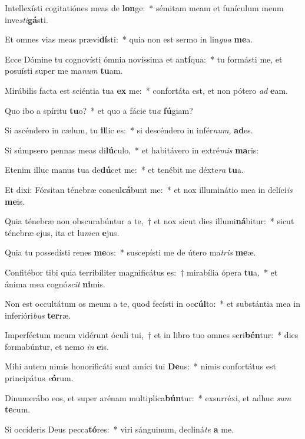 \item Intellexísti cogitatiónes meas de \textbf{lon}ge:~* sémitam meam et funículum meum inve\tinyhspace\textit{sti}\textbf{gá}sti.
\item Et omnes vias meas prævi\textbf{dí}sti:~* quia non est sermo in lin\textit{gua} \textbf{me}a.
\item Ecce Dómine tu cognovísti ómnia novíssima et an\textbf{tí}qua:~* tu formásti me, et posuísti super me ma\teenyhspace\textit{num} \textbf{tu}am.
\item Mirábilis facta est sciéntia tua \textbf{ex} me:~* confortáta est, et non pótero \textit{ad} \textbf{e}am.
\item Quo ibo a spíritu \textbf{tu}o?~* et quo a fácie tu\tinyhspace\textit{a} \textbf{fú}giam?
\item Si ascéndero in cælum, tu \textbf{il}lic es:~* si descéndero in infér\textit{num,} \textbf{ad}es.
\item Si súmpsero pennas meas di\textbf{lú}culo,~* et habitávero in extré\textit{mis} \textbf{ma}ris:
\item Etenim illuc manus tua de\textbf{dú}cet me:~* et tenébit me déxte\textit{ra} \textbf{tu}a.
\item Et dixi: Fórsitan ténebræ concul\textbf{cá}bunt me:~* et nox illuminátio mea in delíci\textit{is} \textbf{me}is.
\item Quia ténebræ non obscurabúntur a te,~† et nox sicut dies illumi\textbf{ná}bitur:~* sicut ténebræ ejus, ita et lu\textit{men} \textbf{e}jus.
\item Quia tu possedísti renes \textbf{me}os:~* suscepísti me de útero ma\tinyhspace\textit{tris} \textbf{me}æ.
\item Confitébor tibi quia terribíliter magnificátus es:~† mirabília ópera \textbf{tu}a,~* et ánima mea cognó\tinyhspace\textit{scit} \textbf{ni}mis.
\item Non est occultátum os meum a te, quod fecísti in oc\textbf{cúl}to:~* et substántia mea in inferióri\textit{bus} \textbf{ter}ræ.
\item Imperféctum meum vidérunt óculi tui,~† et in libro tuo omnes scri\textbf{bén}tur:~* dies formabúntur, et nemo \textit{in} \textbf{e}is.
\item Mihi autem nimis honorificáti sunt amíci tui \textbf{De}us:~* nimis confortátus est principátus \textit{e}\textbf{ó}rum.
\item Dinumerábo eos, et super arénam multiplica\textbf{bún}tur:~* exsurréxi, et adhuc \textit{sum} \textbf{te}cum.
\item Si occíderis Deus pecca\textbf{tó}res:~* viri sánguinum, decliná\tinyhspace\textit{te} \textbf{a} me.
